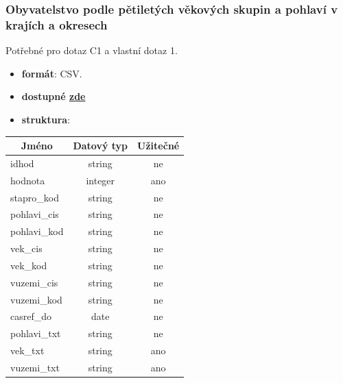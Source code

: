 \documentclass[12pt]{article}
\begin{document}
\subsubsection*{Obyvatelstvo podle pětiletých věkových skupin a pohlaví v krajích a okresech}
Potřebné pro dotaz C1 a vlastní dotaz 1.
\begin{itemize}
    \item \textbf{formát}: CSV.
    \item \textbf{dostupné  \href{https://www.czso.cz/documents/62353418/143522504/130142-21data043021.csv/760fab9c-d079-4d3a-afed-59cbb639e37d?version=1.1}{zde}}
    \item \textbf{struktura}:
\end{itemize}
        \begin{center}
            \begin{tabular}{ |l|c|c| }
                \hline
                \multicolumn{1}{|c|}{Jméno} & Datový typ & Užitečné \\
                \hline
                \hline
                idhod & string & ne \\
                \hline
                hodnota & integer & ano \\
                \hline
                stapro\_kod & string & ne \\
                \hline
                pohlavi\_cis & string & ne \\
                \hline
                pohlavi\_kod & string & ne \\
                \hline
                vek\_cis & string & ne \\
                \hline
                vek\_kod & string & ne \\
                \hline
                vuzemi\_cis & string & ne \\
                \hline
                vuzemi\_kod & string & ne \\
                \hline
                casref\_do & date & ne \\
                \hline
                pohlavi\_txt & string & ne \\
                \hline
                vek\_txt & string & ano \\
                \hline
                vuzemi\_txt & string & ano \\
                \hline
            \end{tabular}
        \end{center}
\end{document}
